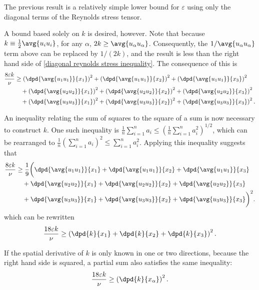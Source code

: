 \documentclass[ccbysa,note,git]{bmtreport}
\begin{document}
The previous result is a relatively simple lower bound for $\varepsilon$ using only the diagonal terms of the Reynolds stress tensor.

A bound based solely on $k$ is desired, however. Note that because $k \equiv \tfrac{1}{2} \avg{u_i u_i}$, for any $\alpha$, $2 k \geq \avg{u_\alpha u_\alpha}$. Consequently, the $1 / \avg{u_\alpha u_\alpha}$ term above can be replaced by $1 / (2 k)$, and the result is less than the right hand side of \eqref{diagonal reynolds stress inequality}. The consequence of this is
\begin{align}
   \frac{8 \varepsilon k}{\nu} &\geq \left(\dpd{\avg{u_1 u_1}}{x_1}\right)^2 + \left(\dpd{\avg{u_1 u_1}}{x_2}\right)^2 + \left(\dpd{\avg{u_1 u_1}}{x_3}\right)^2 \notag \\
                             &\quad + \left(\dpd{\avg{u_2 u_2}}{x_1}\right)^2 + \left(\dpd{\avg{u_2 u_2}}{x_2}\right)^2 + \left(\dpd{\avg{u_2 u_2}}{x_3}\right)^2 \notag \\
                             &\quad + \left(\dpd{\avg{u_3 u_3}}{x_1}\right)^2 + \left(\dpd{\avg{u_3 u_3}}{x_2}\right)^2 + \left(\dpd{\avg{u_3 u_3}}{x_3}\right)^2.
\end{align}

An inequality relating the sum of squares to the square of a sum is now necessary to construct $k$. One such inequality is $\tfrac{1}{n} \sum_{i = 1}^n a_i \leq \left(\tfrac{1}{n} \sum_{i = 1}^n a_i^2\right)^{1/2}$, which can be rearranged to $\tfrac{1}{n} \left(\sum_{i = 1}^n a_i\right)^2 \leq \sum_{i = 1}^n a_i^2$. Applying this inequality suggests that
\begin{align}
   \frac{8 \varepsilon k}{\nu} &\geq \frac{1}{9} \bigg(\dpd{\avg{u_1 u_1}}{x_1} + \dpd{\avg{u_1 u_1}}{x_2} + \dpd{\avg{u_1 u_1}}{x_3} \notag \\
                             &\quad + \dpd{\avg{u_2 u_2}}{x_1} + \dpd{\avg{u_2 u_2}}{x_2} + \dpd{\avg{u_2 u_2}}{x_3} \notag \\
                             &\quad + \dpd{\avg{u_3 u_3}}{x_1} + \dpd{\avg{u_3 u_3}}{x_2} + \dpd{\avg{u_3 u_3}}{x_3}\bigg)^2.
\end{align}
which can be rewritten
\begin{equation}
   \frac{18 \varepsilon k}{\nu} \geq \left(\dpd{k}{x_1} + \dpd{k}{x_2} + \dpd{k}{x_3}\right)^2.
\end{equation}

If the spatial derivative of $k$ is only known in one or two directions, because the right hand side is squared, a partial sum also satisfies the same inequality:
\begin{equation}
   \frac{18 \varepsilon k}{\nu} \geq \left(\dpd{k}{x_\alpha}\right)^2.
\end{equation}
\end{document}
